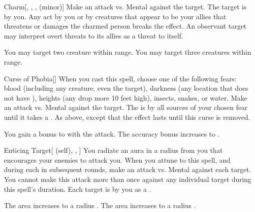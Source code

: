 \lowercase{\hypertarget{spell:Charm}{}}\label{spell:Charm}
\begin{freeability}[Rank 3]{\hypertarget{spell:Charm}{Charm}}[, , ,  (minor)]
Make an attack vs. Mental against the target.
\hit The target is \charmed by you.
Any act by you or by creatures that appear to be your allies that threatens or damages the charmed person breaks the effect.
An observant target may interpret overt threats to its allies as a threat to itself.

\rankline
{} You may target two creature within range.
 You may target three creatures within range.
\end{freeability}
\vspace{0.25em}



\lowercase{\hypertarget{spell:Curse of Phobia}{}}\label{spell:Curse of Phobia}
\begin{freeability}[Rank 3]{\hypertarget{spell:Curse of Phobia}{Curse of Phobia}}[]
When you cast this spell, choose one of the following fears: blood (including any  creature, even the target), darkness (any location that does not have ), heights (any drop more 10 feet high), insects, snakes, or water.
Make an attack vs. Mental against the target.
\hit The is  by all sources of your chosen fear until it takes a .
\crit As above, except that the effect lasts until this curse is removed.

\rankline
{} You gain a  bonus to  with the attack.
 The accuracy bonus increases to .
\end{freeability}
\vspace{0.25em}



\lowercase{\hypertarget{spell:Enticing Target}{}}\label{spell:Enticing Target}
\begin{attuneability}[Rank 3]{\hypertarget{spell:Enticing Target}{Enticing Target}}[ (self), , ]
You radiate an aura in a \areasmall radius  from you that encourages your enemies to attack you.
When you attune to this spell, and during each  in subsequent rounds, make an attack vs. Mental against each target.
You cannot make this attack more than once against any individual target during this spell's duration.
\hit Each target is  by you as a .

\rankline
{} The area increases to a \areamed radius .
 The area increases to a \arealarge radius .
\end{attuneability}
\vspace{0.25em}



